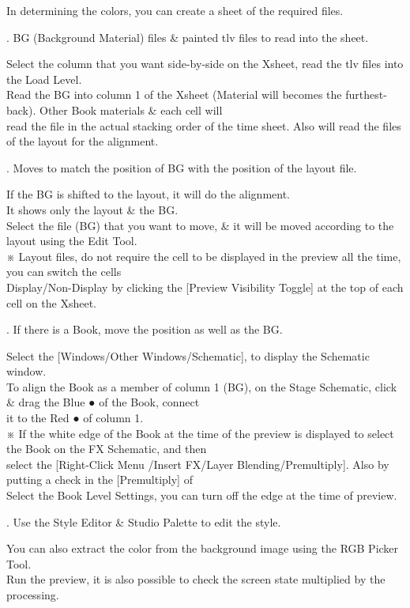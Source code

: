 \documentclass[a4paper,10pt]{article}
\begin{document}
\footnotesize
\noindent In determining the colors, you can create a sheet of the required files.\\
\par
\normalsize
{}. BG (Background Material) files \& painted tlv files to read into the sheet.\par
\footnotesize
\noindent Select the column that you want side-by-side on the Xsheet, read the tlv files into the Load Level.\\
Read the BG into column 1 of the Xsheet (Material will becomes the furthest-back). Other Book materials \& each cell will\\
read the file in the actual stacking order of the time sheet. Also will read the files of the layout for the alignment.\\
\par
\normalsize
{}. Moves to match the position of BG with the position of the layout file.\par
\footnotesize
\noindent If the BG is shifted to the layout, it will do the alignment.\\
It shows only the layout \& the BG.\\
Select the file (BG) that you want to move, \& it will be moved according to the layout using the Edit Tool.\\
※ Layout files, do not require the cell to be displayed in the preview all the time, you can switch the cells\\
Display/Non-Display by clicking the [Preview Visibility Toggle] at the top of each cell on the Xsheet.\\
\par
\normalsize
{}. If there is a Book, move the position as well as the BG.\par
\footnotesize
\noindent Select the [Windows/Other Windows/Schematic], to display the Schematic window.\\
To align the Book as a member of column 1 (BG), on the Stage Schematic, click \& drag the Blue ● of the Book, connect\\
it to the Red ● of column 1.\\
※ If the white edge of the Book at the time of the preview is displayed to select the Book on the FX Schematic, and then\\
select the [Right-Click Menu /Insert FX/Layer Blending/Premultiply]. Also by putting a check in the [Premultiply] of\\
Select the Book Level Settings, you can turn off the edge at the time of preview.\\
\par
\normalsize
{}. Use the Style Editor \& Studio Palette to edit the style.\par
\footnotesize
\noindent You can also extract the color from the background image using the RGB Picker Tool.\\
Run the preview, it is also possible to check the screen state multiplied by the processing.\\
\\
\end{document}

